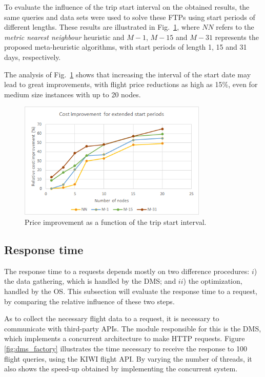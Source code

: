 To evaluate the influence of the trip start interval on the obtained results, the same queries and data sets were used to solve these FTPs using start periods of different lengths.
These results are illustrated in Fig.~\ref{fig:cost_vs_start_period}, where $NN$ refers to the \textit{metric nearest neighbour} heuristic and $M-1$, $M-15$ and $M-31$ represents the proposed meta-heuristic algorithms, with start periods of length 1, 15 and 31 days, respectively. 

The analysis of Fig.~\ref{fig:cost_vs_start_period} shows that increasing the interval of the start date may lead to great improvements, with flight price reductions as high as 15\%, even for medium size instances with up to 20 nodes.  

\begin{figure}[h]
  \centering
  \includegraphics[width=9cm]{./imgs/cost_improvement_startdates.png}
  \caption{Price improvement as a function of the trip start interval.}
  \label{fig:cost_vs_start_period}  
\end{figure}


\subsection{Response time}
\label{sec:response_time}

The response time to a requests depends mostly on two difference procedures: $i$) the data gathering, which is handled by the DMS; and $ii$) the optimization, handled by the OS. This subsection will evaluate the response time to a request, by comparing the relative influence of these two steps. 

As to collect the necessary flight data to a request, it is necessary to communicate with third-party APIs. The module responsible for this is the DMS, which implements a concurrent architecture to make HTTP requests. Figure \ref{fig:dms_factory} illustrates the time necessary to receive the response to 100 flight queries, using the KIWI flight API. By varying the number of threads, it also shows the speed-up obtained by implementing the concurrent system.

